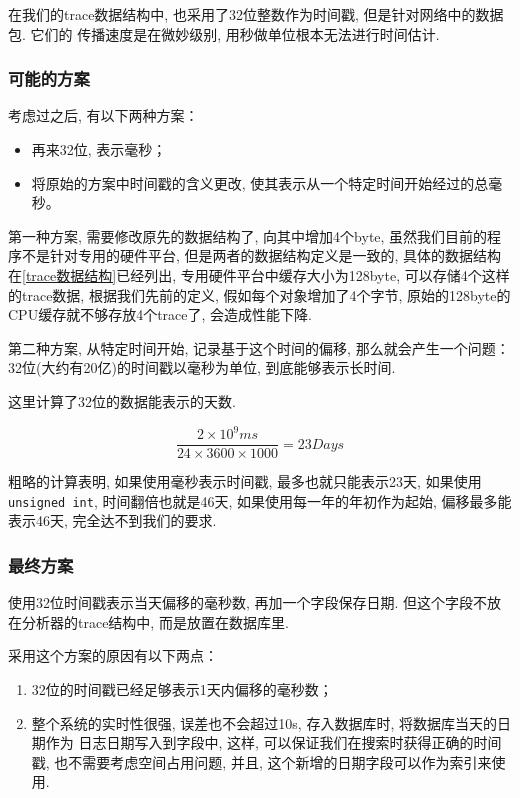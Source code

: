 在我们的trace数据结构中, 也采用了32位整数作为时间戳, 但是针对网络中的数据包. 它们的
传播速度是在微妙级别, 用秒做单位根本无法进行时间估计.

\subsubsection{可能的方案}

考虑过之后, 有以下两种方案：

\begin{itemize}
\item
  再来32位, 表示毫秒；
\item
  将原始的方案中时间戳的含义更改,
  使其表示从一个特定时间开始经过的总毫秒。
\end{itemize}

第一种方案, 需要修改原先的数据结构了, 向其中增加4个byte,
虽然我们目前的程序不是针对专用的硬件平台, 但是两者的数据结构定义是一致的,
具体的数据结构在\ref{trace数据结构}已经列出,
专用硬件平台中缓存大小为128byte, 可以存储4个这样的trace数据,
根据我们先前的定义,
假如每个对象增加了4个字节, 原始的128byte的CPU缓存就不够存放4个trace了,
会造成性能下降.

第二种方案, 从特定时间开始, 记录基于这个时间的偏移, 那么就会产生一个问题：
32位(大约有20亿)的时间戳以毫秒为单位, 到底能够表示长时间.

这里计算了32位的数据能表示的天数.

$$ \frac{2 \times 10^{9} ms }{24 \times 3600 \times 1000} = 23 Days$$

粗略的计算表明, 如果使用毫秒表示时间戳, 最多也就只能表示23天,
如果使用\texttt{unsigned\ int}, 时间翻倍也就是46天,
如果使用每一年的年初作为起始, 偏移最多能表示46天, 完全达不到我们的要求.

\subsubsection{最终方案}

使用32位时间戳表示当天偏移的毫秒数, 再加一个字段保存日期.
但这个字段不放在分析器的trace结构中, 而是放置在数据库里.

采用这个方案的原因有以下两点：

\begin{enumerate}
\def\labelenumi{\arabic{enumi}.}
\item
  32位的时间戳已经足够表示1天内偏移的毫秒数；
\item
  整个系统的实时性很强, 误差也不会超过10s, 存入数据库时,
  将数据库当天的日期作为 日志日期写入到字段中, 这样,
  可以保证我们在搜索时获得正确的时间戳, 也不需要考虑空间占用问题, 并且,
  这个新增的日期字段可以作为索引来使用.
\end{enumerate}

